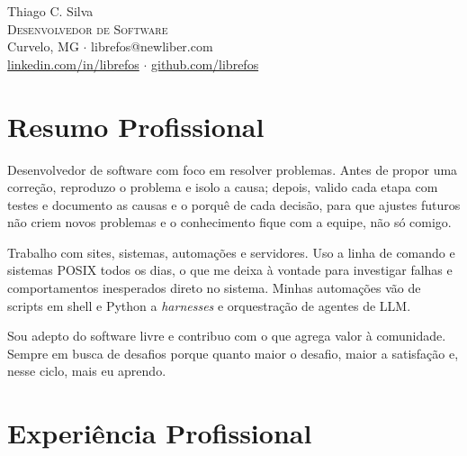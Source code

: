 \documentclass[a4paper,11pt]{article}
\newcommand{\phone}{}
\begin{document}

\begin{center}
  {\Huge Thiago C. Silva} \\
  \vspace*{0.2cm}
  {\scshape Desenvolvedor de Software} \\
  {Curvelo, MG $\cdot$ librefos@newliber.com\phone} \\
  {\href{https://linkedin.com/in/librefos}{linkedin.com/in/librefos} $\cdot$
  \href{https://github.com/librefos}{github.com/librefos}}
\end{center}


\section{Resumo Profissional}
{\setlength{\parindent}{0pt}\setlength{\parskip}{0.5\baselineskip}
Desenvolvedor de software com foco em resolver problemas.  Antes de propor uma
correção, reproduzo o problema e isolo a causa; depois, valido cada etapa com
testes e documento as causas e o porquê de cada decisão, para que ajustes
futuros não criem novos problemas e o conhecimento fique com a equipe, não só
comigo.

Trabalho com sites, sistemas, automações e servidores.  Uso a linha de comando
e sistemas POSIX todos os dias, o que me deixa à vontade para investigar falhas
e comportamentos inesperados direto no sistema.  Minhas automações vão de
scripts em shell e Python a \textit{harnesses} e orquestração de agentes de
LLM.

Sou adepto do software livre e contribuo com o que agrega valor à comunidade.
Sempre em busca de desafios porque quanto maior o desafio, maior a satisfação
e, nesse ciclo, mais eu aprendo.\par}


\section{Experiência Profissional}
\end{document}
